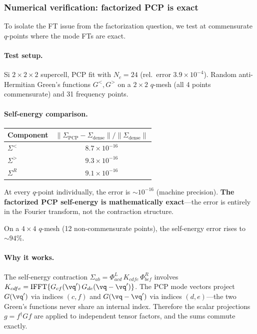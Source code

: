 \subsubsection{Numerical verification: factorized PCP is exact}
\label{sssub:pcp_numerical}

To isolate the FT issue from the factorization question, we
test at commensurate $q$-points where the mode FTs are exact.

\paragraph{Test setup.}
Si $2\times2\times2$ supercell, PCP fit with $N_c = 24$
(rel.\ error $3.9\times10^{-4}$).  Random anti-Hermitian
Green's functions $G^<, G^>$ on a $2\times2$ $q$-mesh (all 4
points commensurate) and 31 frequency points.

\paragraph{Self-energy comparison.}
\begin{center}
\begin{tabular}{lc}
  \toprule
  Component & $\|\Sigma_\mathrm{PCP} - \Sigma_\mathrm{dense}\| / \|\Sigma_\mathrm{dense}\|$ \\
  \midrule
  $\Sigma^<$ & $8.7\times10^{-16}$ \\
  $\Sigma^>$ & $9.3\times10^{-16}$ \\
  $\Sigma^R$ & $9.1\times10^{-16}$ \\
  \bottomrule
\end{tabular}
\end{center}
At every $q$-point individually, the error is $\sim 10^{-16}$
(machine precision).  \textbf{The factorized PCP self-energy
is mathematically exact}---the error is entirely in the Fourier
transform, not the contraction structure.

On a $4\times4$ $q$-mesh (12 non-commensurate points), the
self-energy error rises to $\sim 94\%$.

\paragraph{Why it works.}
The self-energy contraction $\Sigma_{ab} = \Phi^L_{acd}\,K_{cdfe}\,\Phi^R_{bef}$
involves $K_{cdfe} = \mathrm{IFFT}\{G_{cf}(\vq')\,G_{de}(\vq-\vq')\}$.
The PCP mode vectors project $G(\vq')$ via indices $(c,f)$ and
$G(\vq-\vq')$ via indices $(d,e)$---the two Green's functions
never share an internal index.  Therefore the scalar projections
$g = f^\dagger G f$ are applied to independent tensor factors,
and the sums commute exactly.


